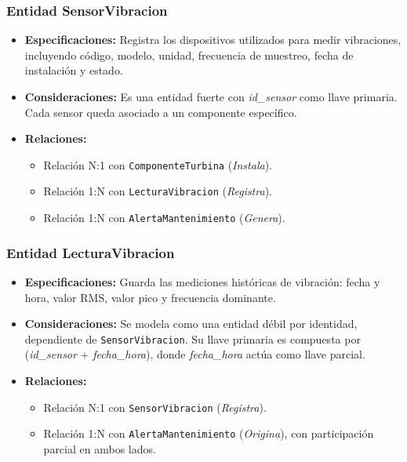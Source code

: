 \documentclass[11pt,a4paper]{article}
\begin{document}
\subsubsection{Entidad SensorVibracion}
\begin{itemize}
    \item \textbf{Especificaciones:} Registra los dispositivos utilizados para medir
    vibraciones, incluyendo código, modelo, unidad, frecuencia de muestreo, fecha de
    instalación y estado.
    \item \textbf{Consideraciones:} Es una entidad fuerte con \textit{id\_sensor}
    como llave primaria. Cada sensor queda asociado a un componente específico.
    \item \textbf{Relaciones:}
    \begin{itemize}
        \item Relación N:1 con \texttt{ComponenteTurbina} (\textit{Instala}).
        \item Relación 1:N con \texttt{LecturaVibracion} (\textit{Registra}).
        \item Relación 1:N con \texttt{AlertaMantenimiento} (\textit{Genera}).
    \end{itemize}
\end{itemize}

\subsubsection{Entidad LecturaVibracion}
\begin{itemize}
    \item \textbf{Especificaciones:} Guarda las mediciones históricas de vibración:
    fecha y hora, valor RMS, valor pico y frecuencia dominante.
    \item \textbf{Consideraciones:} Se modela como una entidad débil por identidad,
    dependiente de \texttt{SensorVibracion}. Su llave primaria es compuesta por
    (\textit{id\_sensor} + \textit{fecha\_hora}), donde \textit{fecha\_hora} actúa
    como llave parcial.
    \item \textbf{Relaciones:}
    \begin{itemize}
        \item Relación N:1 con \texttt{SensorVibracion} (\textit{Registra}).
        \item Relación 1:N con \texttt{AlertaMantenimiento} (\textit{Origina}),
        con participación parcial en ambos lados.
    \end{itemize}
\end{itemize}
\end{document}
